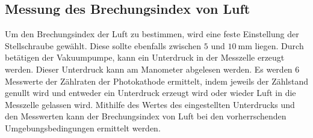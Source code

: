 \subsection{Messung des Brechungsindex von Luft}
\label{subsec:Brechungsindex_Luft}
Um den Brechungsindex der Luft zu bestimmen, wird eine feste Einstellung der Stellschraube gewählt. Diese sollte ebenfalls zwischen $5$ und $\qty{10}{\milli\metre}$
liegen. Durch betätigen der Vakuumpumpe, kann ein Unterdruck in der Messzelle erzeugt werden. Dieser Unterdruck kann am Manometer abgelesen werden.
Es werden 6 Messwerte der Zählraten der Photokathode ermittelt, indem jeweils der Zählstand genullt wird und entweder ein Unterdruck erzeugt wird oder wieder
Luft in die Messzelle gelassen wird. Mithilfe des Wertes des eingestellten Unterdrucks und den Messwerten kann der Brechungsindex von Luft bei den vorherrschenden 
Umgebungsbedingungen ermittelt werden. 

